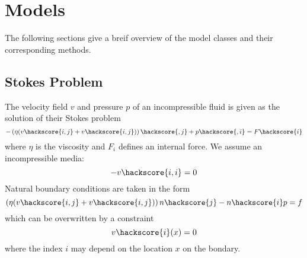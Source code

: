 
%
%
%


\chapter{Models}

The following sections give a breif overview of the model classes and their corresponding methods.

\section{Stokes Problem}
The velocity field $v$ and pressure $p$ of an incompressible fluid is given as the solution of their
Stokes problem
\begin{equation}\label{Stokes 1}
-\left(\eta(v\hackscore{i,j}+ v\hackscore{i,j})\right)\hackscore{,j}+p\hackscore{,i}=F\hackscore{i}
\end{equation}
where $\eta$ is the viscosity and $F_i$ defines an internal force. We assume an incompressible media:
\begin{equation}\label{Stokes 2}
-v\hackscore{i,i}=0
\end{equation}
Natural boundary conditions are taken in the form 
\begin{equation}\label{Stokes Boundary}
\left(\eta(v\hackscore{i,j}+ v\hackscore{i,j})\right)n\hackscore{j}-n\hackscore{i}p=f
\end{equation}
which can be overwritten by a constraint 
\begin{equation}\label{Stokes Boundary0}
v\hackscore{i}(x)=0
\end{equation}
where the index $i$ may depend on the location $x$ on the bondary.


